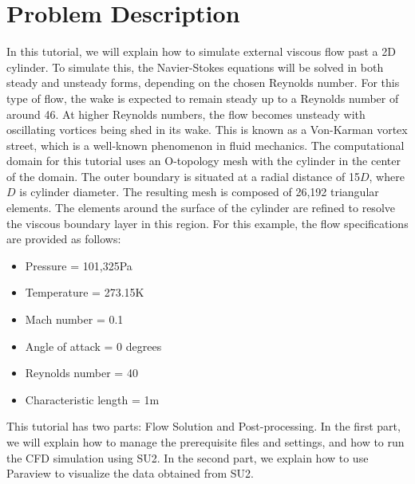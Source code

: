 \section{Problem Description}
In this tutorial, we will explain how to simulate external viscous flow past a 2D cylinder. To simulate this, the Navier-Stokes equations will be solved in both steady and unsteady forms, depending on the chosen Reynolds number. For this type of flow, the wake is expected to remain steady up to a Reynolds number of around 46. At higher Reynolds numbers, the flow becomes unsteady with oscillating vortices being shed in its wake. This is known as a Von-Karman vortex street, which is a well-known phenomenon in fluid mechanics. The computational domain for this tutorial uses an O-topology mesh with the cylinder in the center of the domain. The outer boundary is situated at a radial distance of 15$D$, where $D$ is cylinder diameter. The resulting mesh is composed of 26,192 triangular elements. The elements around the surface of the cylinder are refined to resolve the viscous boundary layer in this region.  For this example, the flow specifications are provided as follows:
\begin{itemize}
    \item Pressure = 101,325Pa
    \item Temperature = 273.15K
    \item Mach number = 0.1
    \item Angle of attack = 0 degrees
    \item Reynolds number = 40
    \item Characteristic length = 1m
\end{itemize}
This tutorial has two parts: Flow Solution and Post-processing. In the first part, we will explain how to manage the prerequisite files and settings, and how to run the CFD simulation using SU2. In the second part, we explain how to use Paraview to visualize the data obtained from SU2.
